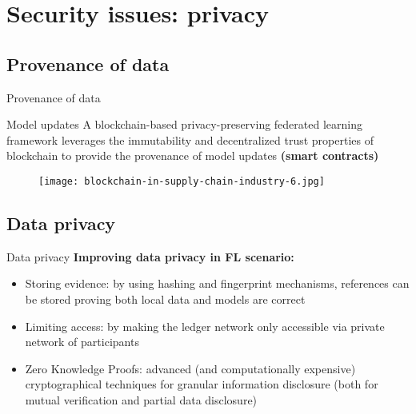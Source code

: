 

\section{Security issues: privacy}

\subsection{Provenance of data}

\begin{frame}{Provenance of data}
  \begin{exampleblock}{Model updates}
  A blockchain-based privacy-preserving federated learning framework leverages the immutability and decentralized trust properties of blockchain to provide the \alert{provenance of model updates} \textbf{(smart contracts)}
  \end{exampleblock}
  \begin{figure}[h]
        \centering
        \texttt{[image: blockchain-in-supply-chain-industry-6.jpg]}
      \end{figure}
\end{frame}

\subsection{Data privacy}

\begin{frame}{Data privacy}
\textbf{Improving data privacy in FL scenario:} 
\begin{itemize}
  		\item \alert{Storing evidence:} by using hashing and fingerprint mechanisms, references can be stored proving both local data and models are correct
  		\item \alert{Limiting access:} by making the ledger network only accessible via private network of participants
  		\item \alert{Zero Knowledge Proofs:} advanced (and computationally expensive) cryptographical techniques for granular information disclosure (both for mutual verification and partial data disclosure) 
\end{itemize}
\end{frame}

